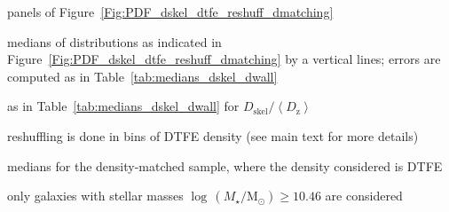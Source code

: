 \documentclass[useAMS,usenatbib]{mnras}
\newcommand{\Mstardot}{M\ensuremath{_{\star}} / \mathrm{M}\ensuremath{_{\odot}}}
\begin{document}
\begin{table*}
\begin{threeparttable}
\begin{tablenotes}
     \item\label{tnote:panels} panels of Figure~\ref{Fig:PDF_dskel_dtfe_reshuff_dmatching}
     \item\label{tnote:median} medians of distributions as indicated in Figure~\ref{Fig:PDF_dskel_dtfe_reshuff_dmatching} by a vertical lines; errors are computed as in Table~\ref{tab:medians_dskel_dwall} 
     \item\label{tnote:before} as in Table~\ref{tab:medians_dskel_dwall} for $D_{\mathrm{skel}}/\left<D_\mathrm{z}\right>$                                     
     \item\label{tnote:after} reshuffling is done in bins of DTFE density (see main text for more details)
     \item\label{tnote:dmatching} medians for the density-matched sample, where the density considered is DTFE
     \item\label{tnote:SF_q_mass} only galaxies with stellar masses  $\log \, (\Mstardot) \geq 10.46$ are considered
    \end{tablenotes}
\end{threeparttable}
\end{table*}

\end{document}
